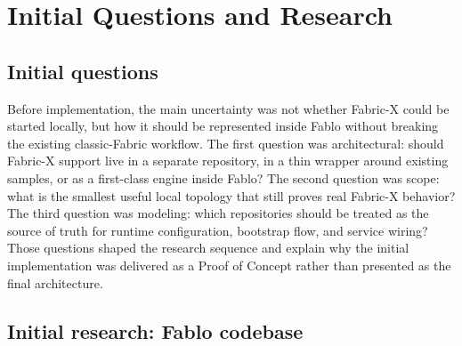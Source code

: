 \section{Initial Questions and Research}

\subsection{Initial questions}

Before implementation, the main uncertainty was not whether Fabric-X could be started locally, but how it should be represented inside Fablo without breaking the existing classic-Fabric workflow. The first question was architectural: should Fabric-X support live in a separate repository, in a thin wrapper around existing samples, or as a first-class engine inside Fablo? The second question was scope: what is the smallest useful local topology that still proves real Fabric-X behavior? The third question was modeling: which repositories should be treated as the source of truth for runtime configuration, bootstrap flow, and service wiring? Those questions shaped the research sequence and explain why the initial implementation was delivered as a Proof of Concept rather than presented as the final architecture.

\subsection{Initial research: Fablo codebase}

